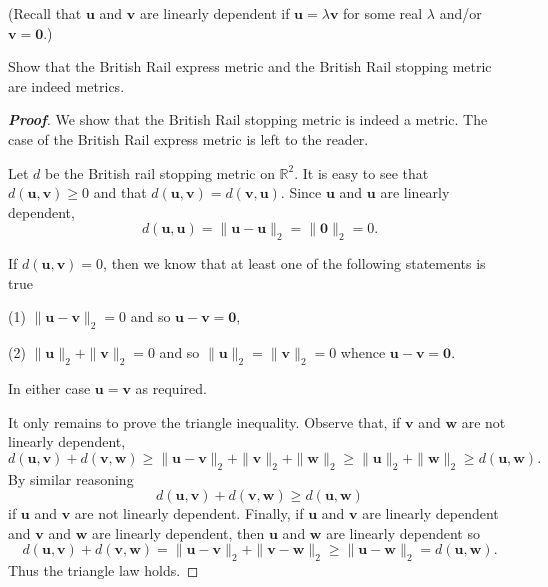 (Recall that ${\mathbf u}$ and ${\mathbf v}$
are linearly dependent if ${\mathbf u}=\lambda{\mathbf v}$
for some real $\lambda$ and/or ${\mathbf v}={\boldsymbol 0}$.)

\begin{theorem}%
\label{P;British Rail is metric} 
Show that the British Rail express metric
and the British Rail stopping metric are indeed metrics.
\end{theorem}
\begin{proof}[\bf Proof]
We show that the British Rail stopping metric is indeed a metric.
The case of the British Rail express metric is left to the reader.

Let $d$ be the British rail stopping metric on ${\mathbb R}^{2}$.
It is easy to see that $d({\mathbf u},{\mathbf v})\geq 0$
and that $d({\mathbf u},{\mathbf v})=d({\mathbf v},{\mathbf u})$.
Since ${\mathbf u}$ and ${\mathbf u}$ are linearly dependent,
\[d({\mathbf u},{\mathbf u})=\|{\mathbf u}-{\mathbf u}\|_{2}
=\|{\boldsymbol 0}\|_{2}=0.\]

If $d({\mathbf u},{\mathbf v})=0$, then we know that at least one
of the following statements is true

(1) $\|{\mathbf u}-{\mathbf v}\|_{2}=0$ and so 
${\mathbf u}-{\mathbf v}={\boldsymbol 0}$,

(2) $\|{\mathbf u}\|_{2}+\|{\mathbf v}\|_{2}=0$ and so
$\|{\mathbf u}\|_{2}=\|{\mathbf v}\|_{2}=0$ whence 
${\mathbf u}-{\mathbf v}={\boldsymbol 0}$.

\noindent In either case ${\mathbf u}={\mathbf v}$ as required.

It only remains to prove the triangle inequality.
Observe that, if ${\mathbf v}$ and ${\mathbf w}$ are not linearly
dependent,
\[d({\mathbf u},{\mathbf v})+d({\mathbf v},{\mathbf w})
\geq \|{\mathbf u}-{\mathbf v}\|_{2}
+\|{\mathbf v}\|_{2}+\|{\mathbf w}\|_{2}
\geq \|{\mathbf u}\|_{2}+\|{\mathbf w}\|_{2}\geq d({\mathbf u},{\mathbf w}).\]
By similar reasoning
\[d({\mathbf u},{\mathbf v})+d({\mathbf v},{\mathbf w})
\geq d({\mathbf u},{\mathbf w})\]
if ${\mathbf u}$ and ${\mathbf v}$ are not linearly
dependent. Finally, if ${\mathbf u}$ and ${\mathbf v}$ are linearly
dependent and ${\mathbf v}$ and ${\mathbf w}$ are linearly
dependent, then ${\mathbf u}$ and ${\mathbf w}$ are linearly
dependent so
\[d({\mathbf u},{\mathbf v})+d({\mathbf v},{\mathbf w})
= \|{\mathbf u}-{\mathbf v}\|_{2}
+\|{\mathbf v}-{\mathbf w}\|_{2}
\geq \|{\mathbf u}-{\mathbf w}\|_{2}=d({\mathbf u},{\mathbf w}).\]
Thus the triangle law holds.
\end{proof}

